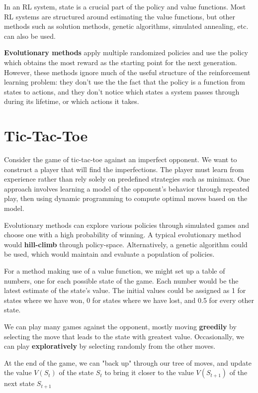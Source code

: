\documentclass{article}
\begin{document}
In an RL system, state is a crucial part of the policy and value
functions. Most RL systems are structured around estimating the value
functions, but other methods such as solution methods, genetic
algorithms, simulated annealing, etc. can also be used.

\textbf{Evolutionary methods} apply multiple randomized policies and use
the policy which obtains the most reward as the starting point for
the next generation. However, these methods ignore much of the useful
structure of the reinforcement learning problem: they don't use the
the fact that the policy is a function from states to actions, and
they don't notice which states a system passes through during its 
lifetime, or which actions it takes.

\pagebreak

\section{Tic-Tac-Toe}

Consider the game of tic-tac-toe against an imperfect opponent. We
want to construct a player that will find the imperfections. The
player must learn from experience rather than rely solely on
predefined strategies such as minimax. One approach involves learning
a model of the opponent's behavior through repeated play,
then using dynamic programming to compute optimal moves based on
the model.

Evolutionary methods can explore various policies through simulated
games and choose one with a high probability of winning. A typical
evolutionary method would \textbf{hill-climb} through policy-space.
Alternatively, a genetic algorithm could be used, which would
maintain and evaluate a population of policies.

For a method making use of a value function, we might set up a table
of numbers, one for each possible state of the game. Each number would
be the latest estimate of the state's value. The initial values could
be assigned as 1 for states where we have won, 0 for states where we
have lost, and 0.5 for every other state.

We can play many games against the opponent, mostly moving 
\textbf{greedily} by selecting the move that leads to the state with
greatest value. Occasionally, we can play \textbf{exploratively}
by selecting randomly from the other moves.

At the end of the game, we can "back up" through our tree of moves,
and update the value $V(S_t)$ of the state $S_t$ to bring it
closer to the value $V(S_{t+1})$ of the next state $S_{t+1}$
\end{document}
